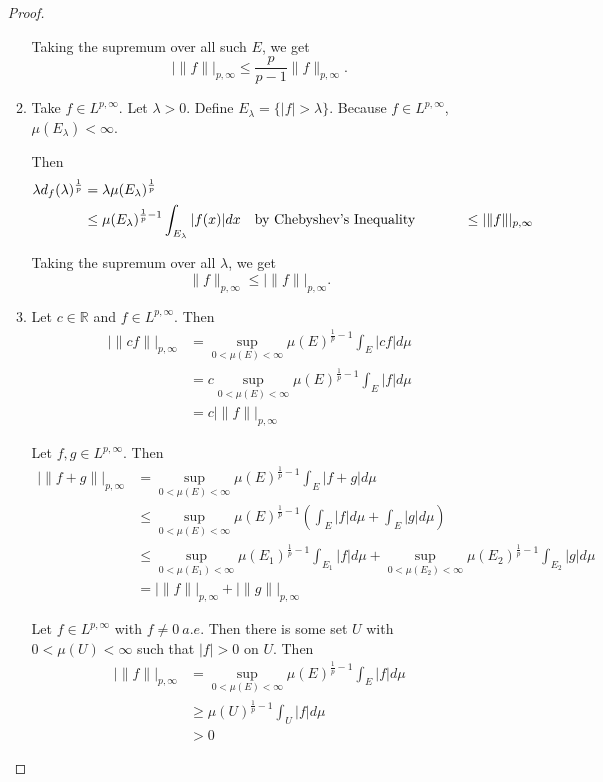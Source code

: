 \documentclass[a4paper]{article}
\newcommand{\R}{\mathbb{R}}
\begin{document}
\begin{enumerate}
\begin{proof}
\begin{enumerate}
          Taking the supremum over all such $E$, we get
          \[ | \|f\| |_{p,\infty} \leq \frac{p}{p-1} \| f \|_{p,\infty} .\]

        \item
          Take $f \in L^{p,\infty}$. Let $\lambda>0$. Define $E_\lambda = \{ |f| > \lambda \}$. Because $f \in L^{p,\infty}$, $\mu(E_\lambda) <
          \infty$.

          Then
          \begin{align*}
            \lambda d_f(\lambda)^{\frac{1}{p}} &= \lambda \mu(E_\lambda)^{\frac{1}{p}} \\
            &\leq \mu(E_\lambda)^{\frac{1}{p} - 1} \int_{E_\lambda}^{} |f(x)| dx \quad \parbox{5cm}{by Chebyshev's Inequality}
            &\leq | \|f\| |_{p,\infty}
          \end{align*}

          Taking the supremum over all $\lambda$, we get
          \[ \|f\|_{p,\infty} \leq | \|f\| |_{p,\infty} .\]

        \item
          Let $c \in \R$ and $f \in L^{p,\infty}$. Then
          \begin{align*}
            | \| cf \| |_{p,\infty} &= \sup_{0 < \mu(E) < \infty} \mu(E)^{\frac{1}{p}-1} \int_{E}^{} |cf| d\mu \\
            &= c \sup_{0 < \mu(E) < \infty} \mu(E)^{\frac{1}{p} - 1} \int_{E}^{} |f| d\mu \\
            &= c | \| f \| |_{p,\infty}
          \end{align*}

          Let $f,g \in L^{p,\infty}$. Then
          \begin{align*}
            | \| f+g \| |_{p,\infty} &= \sup_{0 < \mu(E) < \infty} \mu(E)^{\frac{1}{p} - 1} \int_{E}^{} |f+g| d\mu \\
            &\leq \sup_{0 < \mu(E) < \infty} \mu(E)^{\frac{1}{p} - 1} \left( \int_{E}^{} |f| d\mu + \int_{E}^{} |g| d\mu \right) \\
            &\leq \sup_{0 < \mu(E_1) < \infty} \mu(E_1)^{\frac{1}{p} - 1} \int_{E_1}^{} |f| d\mu + \sup_{0 < \mu(E_2) < \infty}
            \mu(E_2)^{\frac{1}{p} - 1} \int_{E_2}^{} |g| d\mu \\
            &= | \|f\| |_{p,\infty} + | \|g\| |_{p,\infty}
          \end{align*}

          Let $f \in L^{p,\infty}$ with $f \neq 0 \ a.e.$ Then there is some set $U$ with $0 < \mu(U) < \infty$ such that $|f|>0$ on $U$. Then
          \begin{align*}
            | \| f \| |_{p,\infty} &= \sup_{0 < \mu(E) < \infty} \mu(E)^{\frac{1}{p}-1} \int_{E}^{} |f| d\mu \\
            &\geq \mu(U)^{\frac{1}{p}-1} \int_{U}^{} |f| d\mu \\
            &>0
          \end{align*}


\end{enumerate}
\end{proof}
\end{enumerate}
\end{document}
